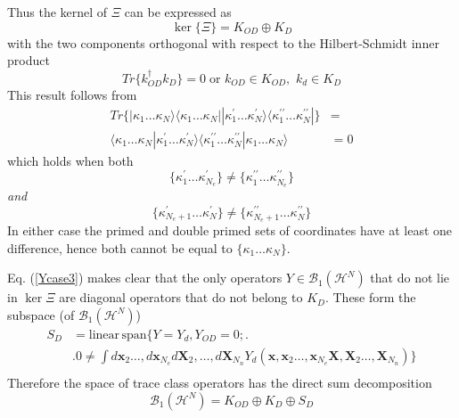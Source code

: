 \documentclass[aps,preprint]{revtex4}%
\begin{document}
Thus the kernel of $\Xi$ can be expressed as
\begin{equation}
\ker\{\Xi\}=K_{OD}\oplus K_{D}%
\end{equation}
with the two components orthogonal with respect to the Hilbert-Schmidt inner
product
\begin{equation}
Tr\{k_{OD}^{\dagger}k_{D}\}=0\;\mathrm{or}\,\,k_{OD}\in K_{OD},\,\,k_{d}\in
K_{D}%
\end{equation}
This result follows from
\begin{align}
Tr\{|\kappa_{1}\ldots\kappa_{N}\rangle\langle\kappa_{1}\ldots\kappa
_{N}||\kappa_{1}^{\prime}\ldots\kappa_{N}^{\prime}\rangle\langle\kappa
_{1}^{\prime\prime}\ldots\kappa_{N}^{\prime\prime}|\}  &  =\nonumber\\
\langle\kappa_{1}\ldots\kappa_{N}|\kappa_{1}^{\prime}\ldots\kappa_{N}^{\prime
}\rangle\langle\kappa_{1}^{\prime\prime}\ldots\kappa_{N}^{\prime\prime}%
|\kappa_{1}\ldots\kappa_{N}\rangle &  =0
\end{align}
which holds when both
\begin{equation}
\{\kappa_{1}^{\prime}\ldots\kappa_{N_{e}}^{\prime}\}\neq\{\kappa_{1}%
^{\prime\prime}\ldots\kappa_{N_{e}}^{\prime\prime}\}
\end{equation}
\emph{and}
\begin{equation}
\{\kappa_{N_{e}+1}^{\prime}\ldots\kappa_{N}^{\prime}\}\neq\{\kappa_{N_{e}%
+1}^{\prime\prime}\ldots\kappa_{N}^{\prime\prime}\}
\end{equation}
In either case the primed and double primed sets of coordinates have at least
one difference, hence both cannot be equal to $\{\kappa_{1}\ldots\kappa_{N}\}$.

Eq. (\ref{Ycase3}) makes clear that the only operators $Y\in\mathcal{B}%
_{1}(\mathcal{H}^{N})$ that do not lie in $\ker\Xi$ are diagonal operators
that do not belong to $K_{D}$. These form the subspace (of $\mathcal{B}%
_{1}(\mathcal{H}^{N})$)
\begin{align}
S_{D}  &  =\mathrm{linear\,span}\big\{Y=Y_{d},Y_{OD}=0;\big.\qquad\nonumber\\
&  \big.0\neq\!\!\!\int d\mathbf{x}_{2}\ldots,d\mathbf{x}_{N_{e}}%
d\mathbf{X}_{2},\ldots,d\mathbf{X}_{N_{n}}Y_{d}(\mathbf{x},\mathbf{x}%
_{2}\ldots,\mathbf{x}_{N_{e}}\mathbf{X},\mathbf{X}_{2}\ldots,\mathbf{X}%
_{N_{n}})\!\big\}\nonumber\\
&  \label{sddefn}%
\end{align}
Therefore the space of trace class operators has the direct sum decomposition
\begin{equation}
\mathcal{B}_{1}(\mathcal{H}^{N})=K_{OD}\oplus K_{D}\oplus S_{D} \label{decomp}%
\end{equation}
\end{document}

